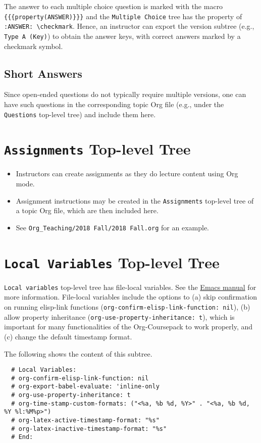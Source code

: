 \documentclass[10pt,article]{article}
\begin{document}
\begin{mdframed}
The answer to each multiple choice question is marked with the macro
\texttt{\{\{\{property(ANSWER)\}\}\}} and the \texttt{Multiple Choice} tree has the property of \texttt{:ANSWER:
\textbackslash{}checkmark}. Hence, an instructor can export the version subtree (e.g., \texttt{Type A
(Key)}) to obtain the answer keys, with correct answers marked by a checkmark symbol.
\end{mdframed}


\subsection{Short Answers}
\label{sec:org2acea3f}
Since open-ended questions do not typically require multiple versions,
one can have such questions in the corresponding topic Org file
(e.g., under the \texttt{Questions} top-level tree) and include them here.
\section{\texttt{Assignments} Top-level Tree}
\label{sec:org36aab79}
\begin{itemize}
\item Instructors can create assignments as they do lecture content using Org mode.
\item Assignment instructions may be created in the \texttt{Assignments} top-level
tree of a topic Org file, which are then included here.
\item See \texttt{Org\_Teaching/2018 Fall/2018 Fall.org} for an example.
\end{itemize}
\section{\texttt{Local Variables} Top-level Tree}
\label{sec:orga7cdcd2}
\texttt{Local variables} top-level tree has file-local variables. See the
\href{https://www.gnu.org/software/emacs/manual/html\_node/emacs/Specifying-File-Variables.html\#Specifying-File-Variables}{Emacs manual} for more information. File-local variables include the
options to (a) skip confirmation on running elisp-link functions
(\texttt{org-confirm-elisp-link-function: nil}), (b) allow property
inheritance (\texttt{org-use-property-inheritance: t}), which is important
for many functionalities of the Org-Coursepack to work properly, and (c)
change the default timestamp format.

The following shows the content of this subtree.

{\small
\begin{verbatim}
  # Local Variables:
  # org-confirm-elisp-link-function: nil
  # org-export-babel-evaluate: 'inline-only
  # org-use-property-inheritance: t
  # org-time-stamp-custom-formats: ("<%a, %b %d, %Y>" . "<%a, %b %d, %Y %l:%M%p>")
  # org-latex-active-timestamp-format: "%s"
  # org-latex-inactive-timestamp-format: "%s"
  # End:
\end{verbatim}
}
\end{document}
